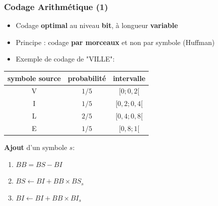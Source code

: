 \documentclass[aspectratio=43]{beamer}
\begin{document}
\begin{frame}
    \frametitle{Codage Arithmétique (1)}

    \begin{itemize}
        \item Codage \textbf{optimal} au niveau \textbf{bit}, à longueur \textbf{variable}
        \item Principe : codage \textbf{par morceaux} et non par symbole (Huffman)
        \item Exemple de codage de "VILLE":
    \end{itemize}

    \vspace*{1em}
    
    {
    \centering
    \begin{tabular}{c | c | c}
        symbole source & probabilité & intervalle  \\
        \hline
        V & $1/5$ & $[0; 0,2[$ \\ 
        I & $1/5$ & $[0,2; 0,4[$\\
        L & $2/5$ & $[0,4; 0,8[$\\
        E & $1/5$ & $[0,8; 1[$\\ \hline
    \end{tabular}\par
    }

    \vspace*{1em}

    \textbf{Ajout} d'un symbole $s$: \\
    \begin{enumerate}
        \item $BB = BS - BI$
        \item $BS \leftarrow BI + BB \times BS_s$
        \item $BI \leftarrow BI + BB \times BI_s$
    \end{enumerate}

\end{frame}
\end{document}
